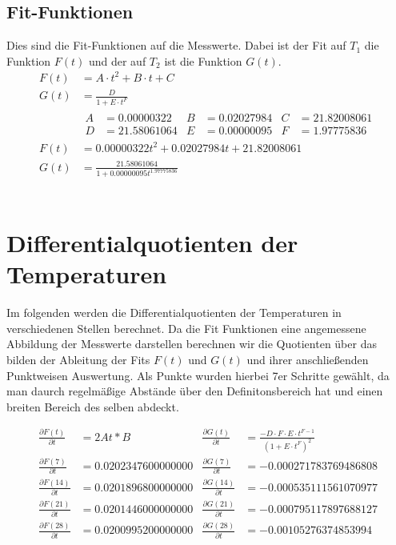 \subsection{Fit-Funktionen}
Dies sind die Fit-Funktionen auf die Messwerte. Dabei ist der Fit auf $T_1$ die Funktion $F(t)$ und der auf $T_2$ ist die Funktion $G(t)$.
\begin{align}
    F(t) &=A \cdot t^2+B \cdot t+ C \\
    G(t) &= \frac{D}{1+E \cdot t^{F}}\\
    &\begin{aligned}
        A &=0.00000322 & B&=0.02027984 & C&=21.82008061 \\
        D &=21.58061064 & E&= 0.00000095& F&=1.97775836 
    \end{aligned}\\
    F(t) &=0.00000322t^2+0.02027984t+21.82008061 \\
    G(t) &= \frac{21.58061064}{1+0.00000095t^{1.97775836}}
\end{align}
\\

\section{Differentialquotienten der Temperaturen}
Im folgenden werden die Differentialquotienten der Temperaturen in verschiedenen Stellen berechnet.
Da die Fit Funktionen eine angemessene Abbildung der Messwerte darstellen berechnen wir die Quotienten über das bilden der Ableitung der Fits $F(t)$ und $G(t)$ 
und ihrer anschließenden Punktweisen Auswertung.
Als Punkte wurden hierbei 7er Schritte gewählt, da man daurch regelmäßige Abstände über den Definitonsbereich hat und einen breiten Bereich des selben abdeckt.

\begin{align}
    \frac{\partial F(t)}{\partial t} &=2At*B & \frac{\partial G(t)}{\partial t} &= \frac{-D \cdot F\cdot E \cdot t^{F-1}}{(1+E\cdot t^{F})^{2}}\\
    \frac{\partial F(7)}{\partial t} &=0.0202347600000000   &     \frac{\partial G(7)}{\partial t} &= -0.000271783769486808  \\
    \frac{\partial F(14)}{\partial t} &=0.0201896800000000   &     \frac{\partial G(14)}{\partial t} &=  -0.000535111561070977 \\
    \frac{\partial F(21)}{\partial t} &=0.0201446000000000   &     \frac{\partial G(21)}{\partial t} &= -0.000795117897688127  \\
    \frac{\partial F(28)}{\partial t} &= 0.0200995200000000  &     \frac{\partial G(28)}{\partial t} &= -0.00105276374853994 
\end{align}
\\
\\
